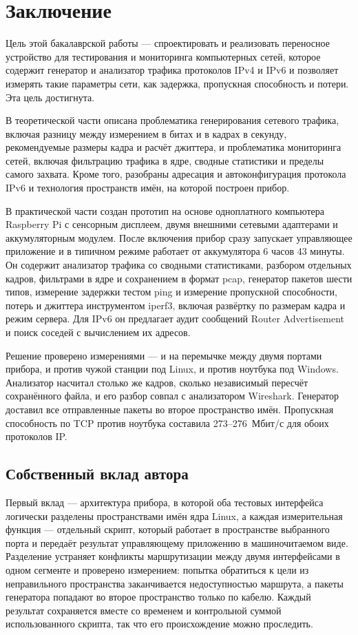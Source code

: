 \chapter{Заключение}
\label{sec:zaver}

Цель этой бакалаврской работы — спроектировать и реализовать переносное устройство для тестирования и мониторинга компьютерных сетей, которое содержит генератор и анализатор трафика протоколов IPv4 и IPv6 и позволяет измерять такие параметры сети, как задержка, пропускная способность и потери. Эта цель достигнута.

В теоретической части описана проблематика генерирования сетевого трафика, включая разницу между измерением в битах и в кадрах в секунду, рекомендуемые размеры кадра и расчёт джиттера, и проблематика мониторинга сетей, включая фильтрацию трафика в ядре, сводные статистики и пределы самого захвата. Кроме того, разобраны адресация и автоконфигурация протокола IPv6 и технология пространств имён, на которой построен прибор.

В практической части создан прототип на основе одноплатного компьютера Raspberry Pi с сенсорным дисплеем, двумя внешними сетевыми адаптерами и аккумуляторным модулем. После включения прибор сразу запускает управляющее приложение и в типичном режиме работает от аккумулятора 6 часов 43 минуты. Он содержит анализатор трафика со сводными статистиками, разбором отдельных кадров, фильтрами в ядре и сохранением в формат pcap, генератор пакетов шести типов, измерение задержки тестом ping и измерение пропускной способности, потерь и джиттера инструментом iperf3, включая развёртку по размерам кадра и режим сервера. Для IPv6 он предлагает аудит сообщений Router Advertisement и поиск соседей с вычислением их адресов.

Решение проверено измерениями — и на перемычке между двумя портами прибора, и против чужой станции под Linux, и против ноутбука под Windows. Анализатор насчитал столько же кадров, сколько независимый пересчёт сохранённого файла, и его разбор совпал с анализатором Wireshark. Генератор доставил все отправленные пакеты во второе пространство имён. Пропускная способность по TCP против ноутбука составила 273--276~Мбит/с для обоих протоколов IP.

\section*{Собственный вклад автора}

Первый вклад — архитектура прибора, в которой оба тестовых интерфейса логически разделены пространствами имён ядра Linux, а каждая измерительная функция — отдельный скрипт, который работает в пространстве выбранного порта и передаёт результат управляющему приложению в машиночитаемом виде. Разделение устраняет конфликты маршрутизации между двумя интерфейсами в одном сегменте и проверено измерением: попытка обратиться к цели из неправильного пространства заканчивается недоступностью маршрута, а пакеты генератора попадают во второе пространство только по кабелю. Каждый результат сохраняется вместе со временем и контрольной суммой использованного скрипта, так что его происхождение можно проследить.

